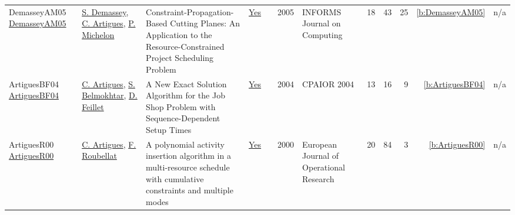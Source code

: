 {\begin{longtable}{>{\raggedright\arraybackslash}p{3cm}>{\raggedright\arraybackslash}p{6cm}>{\raggedright\arraybackslash}p{6.5cm}rrrp{2.5cm}rrrrr}
DemasseyAM05 \href{http://dx.doi.org/10.1287/ijoc.1030.0043}{DemasseyAM05} & \hyperref[auth:a245]{S. Demassey}, \hyperref[auth:a6]{C. Artigues}, \hyperref[auth:a358]{P. Michelon} & Constraint-Propagation-Based Cutting Planes: An Application to the Resource-Constrained Project Scheduling Problem & \href{../works/DemasseyAM05.pdf}{Yes} & \cite{DemasseyAM05} & 2005 & INFORMS Journal on Computing & 18 & 43 & 25 & \ref{b:DemasseyAM05} & n/a\\
ArtiguesBF04 \href{https://doi.org/10.1007/978-3-540-24664-0_3}{ArtiguesBF04} & \hyperref[auth:a6]{C. Artigues}, \hyperref[auth:a386]{S. Belmokhtar}, \hyperref[auth:a359]{D. Feillet} & A New Exact Solution Algorithm for the Job Shop Problem with Sequence-Dependent Setup Times & \href{../works/ArtiguesBF04.pdf}{Yes} & \cite{ArtiguesBF04} & 2004 & CPAIOR 2004 & 13 & 16 & 9 & \ref{b:ArtiguesBF04} & n/a\\
ArtiguesR00 \href{https://doi.org/10.1016/S0377-2217(99)00496-8}{ArtiguesR00} & \hyperref[auth:a6]{C. Artigues}, \hyperref[auth:a718]{F. Roubellat} & A polynomial activity insertion algorithm in a multi-resource schedule with cumulative constraints and multiple modes & \href{../works/ArtiguesR00.pdf}{Yes} & \cite{ArtiguesR00} & 2000 & European Journal of Operational Research & 20 & 84 & 3 & \ref{b:ArtiguesR00} & n/a\\
\end{longtable}
}

\clearpage
